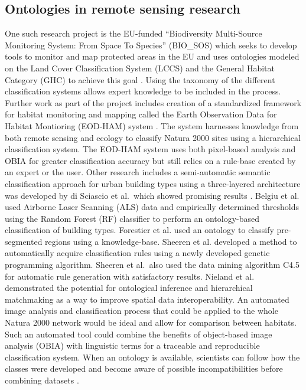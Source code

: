 \documentclass[authoryear, review,12pt,number]{elsarticle}
\begin{document}
\subsection{Ontologies in remote sensing research}
One such research project is the EU-funded ``Biodiversity Multi-Source
Monitoring System:
From Space To Species'' (BIO\_SOS) which seeks to develop tools to monitor and
map protected areas in the EU and uses ontologies modeled on the Land Cover
Classification System (LCCS) and the General Habitat Category (GHC) to achieve
this goal \citep{Arvor2013}. Using the taxonomy of the different classification
systems allows expert knowledge to be included in the process.
Further work as part of the project includes creation of a standardized
framework for habitat monitoring and mapping called the Earth Observation Data
for Habitat Montioring (EOD-HAM) system \citep{Lucas2015}. The system harnesses
knowledge from both remote sensing and ecology to classify Natura 2000 sites
using a hierarchical classification system. The EOD-HAM system uses both
pixel-based analysis and OBIA for greater classification accuracy but still
relies on a rule-base created by an expert or the user. Other research includes
a semi-automatic semantic classification approach for urban building types using
a three-layered architecture was developed by di Sciascio et al.\ which showed
promising results \citep{diSciascio2013}. Belgiu et al. \citep{Belgiu2014} used
Airborne Laser Scanning (ALS) data and empirically determined thresholds using
the Random Forest (RF) classifier to perform an ontology-based classification of
building types. Forestier et al. \citep{Forestier2012470} used an ontology to
classify pre-segmented regions using a knowledge-base. Sheeren et al.
\citep{Sheeren2006ML} developed a method to automatically acquire classification
rules using a newly developed genetic programming algorithm.
Sheeren et al.\ also used the data mining algorithm C4.5 for automatic rule
generation with satisfactory results. Nieland et al. \citep{Nieland2015}
demonstrated the potential for ontological inference and hierarchical
matchmaking as a way to improve spatial data interoperability. An automated
image analysis and classification process that could be applied to the whole
Natura 2000 network would be ideal and allow for comparison between habitats.
Such an automated tool could combine the benefits of object-based image analysis
(OBIA) with linguistic terms for a traceable and reproducible classification
system. When an ontology is available, scientists can follow how the classes
were developed and become aware of possible incompatibilities before combining
datasets \citep{Janowicz2012}.
\end{document}
